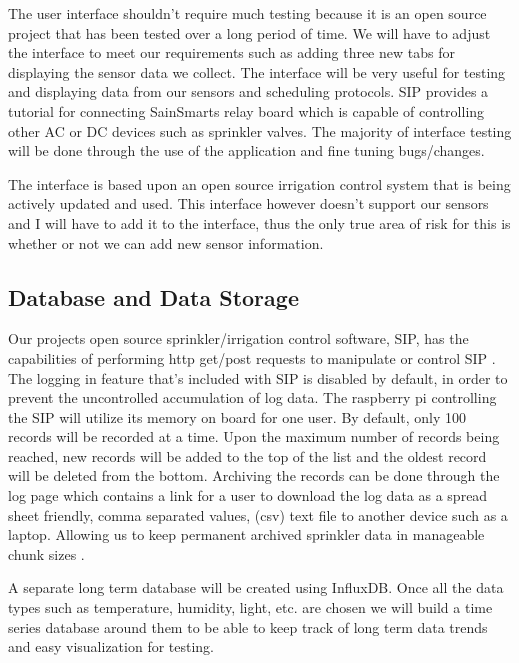 \documentclass[letterpaper, 10 pt, conference]{ieeeconf}  %
\begin{document}
The user interface shouldn't require much testing because it is an open source project that has been tested over a long period of time. We will have to adjust the interface to meet our requirements such as adding three new tabs for displaying the sensor data we collect. The interface will be very useful for testing and displaying data from our sensors and scheduling protocols. SIP provides a tutorial for connecting SainSmarts relay board which is capable of controlling other AC or DC devices such as sprinkler valves. The majority of interface testing will be done through the use of the application and fine tuning bugs/changes.

The interface is based upon an open source irrigation control system that is being actively updated and used. This interface however doesn't support our sensors and I will have to add it to the interface, thus the only true area of risk for this is whether or not we can add new sensor information.


\subsection{Database and Data Storage}
Our projects open source sprinkler/irrigation control software, SIP, has the capabilities of performing http get/post requests to manipulate or control SIP \cite{SIP}. The logging in feature that's included with SIP is disabled by default, in order to prevent the uncontrolled accumulation of log data. The raspberry pi controlling the SIP will utilize its memory on board for one user. By default, only 100 records will be recorded at a time. Upon the maximum number of records being reached, new records will be added to the top of the list and the oldest record will be deleted from the bottom. Archiving the records can be done through the log page which contains a link for a user to download the log data as a spread sheet friendly, comma separated values, (csv) text file to another device such as a laptop. Allowing us to keep permanent archived sprinkler data in manageable chunk sizes \cite{SIP}.

A separate long term database will be created using InfluxDB. Once all the data types such as temperature, humidity, light, etc. are chosen we will build a time series database around them to be able to keep track of long term data trends and easy visualization for testing.
\end{document}
